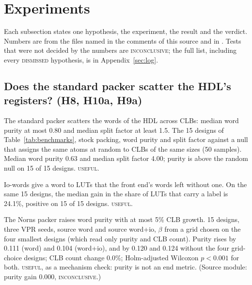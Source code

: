 \section{Experiments}
\label{sec:experiments}

Each subsection states one hypothesis, the experiment, the result and the verdict. Numbers are from the files named in the comments of this source and in . Tests that were not decided by the numbers are \textsc{inconclusive}; the full list, including every \textsc{dismissed} hypothesis, is in Appendix~\ref{sec:log}.

\subsection{Does the standard packer scatter the HDL's registers? (H8, H10a, H9a)}
\label{sec:e-scatter}

 The standard packer scatters the words of the HDL across CLBs: median word purity at most 0.80 and median split factor at least 1.5.
 The 15 designs of Table~\ref{tab:benchmarks}, stock packing, word purity and split factor against a null that assigns the same atoms at random to CLBs of the same sizes (50 samples).
 Median word purity 0.63 and median split factor 4.00; purity is above the random null on 15 of 15 designs. %
 \textsc{useful}.

 Io-words give a word to LUTs that the front end's words left without one.
 On the same 15 designs, the median gain in the share of LUTs that carry a label is 24.1\%, positive on 15 of 15 designs. %
 \textsc{useful}.

 The Norns packer raises word purity with at most 5\% CLB growth.
 15 designs, three VPR seeds, source word and source word+io, $\beta$ from a grid chosen on the four smallest designs (which read only purity and CLB count).
 Purity rises by 0.111 (word) and 0.104 (word+io), and by 0.120 and 0.124 without the four grid-choice designs; CLB count change 0.0\%; Holm-adjusted Wilcoxon $p<0.001$ for both. %
 \textsc{useful}, as a mechanism check: purity is not an end metric. (Source module: purity gain 0.000, \textsc{inconclusive}.)

